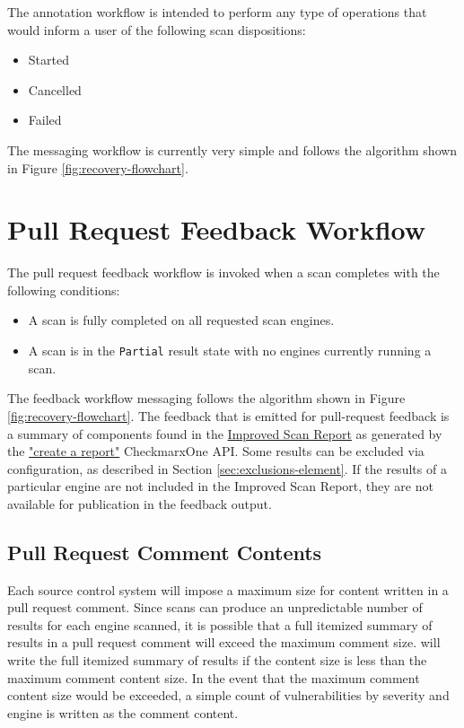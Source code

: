 The annotation workflow is intended to perform any type of operations that
would inform a user of the following scan dispositions:

\begin{itemize}
    \item Started
    \item Cancelled
    \item Failed
\end{itemize}

The messaging workflow is currently very simple and follows the algorithm
shown in Figure \ref{fig:recovery-flowchart}.

\section{Pull Request Feedback Workflow}\label{sec:pull-request-workflow}

The pull request feedback workflow is invoked when a scan completes with the
following conditions:

\begin{itemize}
    \item A scan is fully completed on all requested scan engines.
    \item A scan is in the \texttt{Partial} result state with no
    engines currently running a scan.
\end{itemize}

The feedback workflow messaging follows the algorithm shown in
Figure \ref{fig:recovery-flowchart}.  The feedback that is emitted
for pull-request feedback is a summary of components found in the
\href{https://docs.checkmarx.com/en/34965-182434-checkmarx-one-reporting.html}{Improved Scan Report}
as generated by the
\href{https://checkmarx.stoplight.io/docs/checkmarx-one-api-reference-guide/branches/main/7bf86350cfe72-create-a-report}{"create a report"}
CheckmarxOne API.  Some results can be excluded via configuration,
as described in Section \ref{sec:exclusions-element}.  If the results of a particular
engine are not included in the Improved Scan Report, they are not available for
publication in the feedback output.

\subsection{Pull Request Comment Contents}

Each source control system will impose a maximum size for content written in
a pull request comment.  Since scans can produce an unpredictable number of
results for each engine scanned, it is possible that a full itemized
summary of results in a pull request comment will exceed the maximum comment
size.  \cxoneflow will write the full itemized summary of results if the
content size is less than the maximum comment content size.  In the event that
the maximum comment content size would be exceeded, a simple count of
vulnerabilities by severity and engine is written as the comment content.


